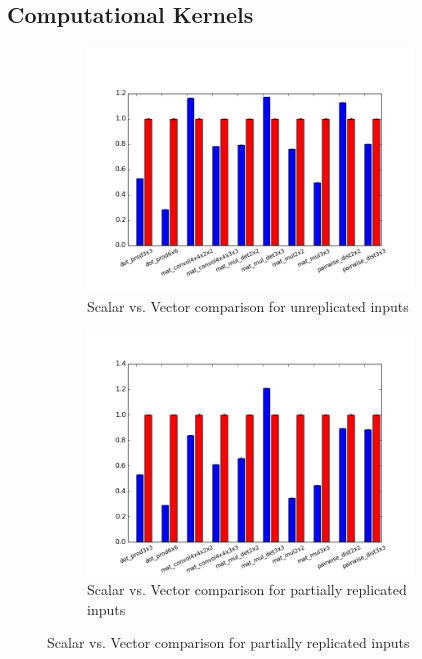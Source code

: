 \subsection{Computational Kernels}
\begin{figure}
    \begin{subfigure}{0.3\textwidth}
        \includegraphics[width=0.95\textwidth]{figures/newAspectRatioGraphs/DataUnreplicatedENC+RUN.png}
        \caption{Scalar vs. Vector comparison for unreplicated inputs}\label{fig:ml-kernels-unrepl}
    \end{subfigure}
    \begin{subfigure}{0.3\textwidth}
        \includegraphics[width=0.95\textwidth]{figures/newAspectRatioGraphs/DataPartiallyReplicatedENC+RUN.png}
        \caption{Scalar vs. Vector comparison for partially replicated inputs}\label{fig:ml-kernels-part-repl}

\end{subfigure}
\end{figure}
